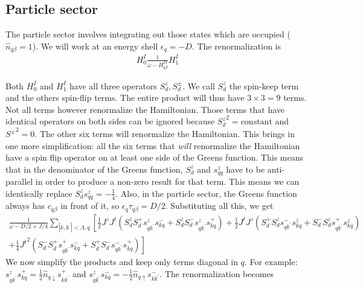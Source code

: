 \documentclass{revtex4-2}
\numberwithin{equation}{section}
\begin{document}
\subsection{Particle sector}
The particle sector involves integrating out those states which are occupied (\(\hat n_{q\beta}=1\)). We will work at an energy  shell \(\epsilon_q = -D\). The renormalization is
\begin{equation}\begin{aligned}
	H^I_0 \frac{1}{\omega - H^D_{q\beta}} H^I_1
\end{aligned}\end{equation}

Both \(H^I_0\) and \(H^I_1\) have all three operators \(S_d^z, S_d^\pm\). We call \(S_d^z\) the spin-keep term and the others spin-flip terms. The entire product will thus have \(3\times 3 = 9\) terms. Not all terms however renormalize the Hamiltonian. Those terms that have identical operators on both sides can be ignored because \({S_d^z}^2 = \text{constant}\) and \({S^\pm}^2 = 0\). The other six terms will renormalize the Hamiltonian. This brings in one more simplification: all the six terms that \textit{will} renormalize the Hamiltonian have a spin flip operator on at least one side of the Greens function. This means that in the denominator of the Greens function, \(S_d^z\) and \(s^z_{qq}\) have to be anti-parallel in order to produce a non-zero result for that term. This means we can identically replace \(S_d^z s^z_{qq} = -\frac{1}{4}\). Also, in the particle sector, the Greens function always has \(c_{q\beta}\) in front of it, so \(\epsilon_q \tau_{q\beta} = D/2\). Substituting all this, we get
\begin{equation}\begin{aligned}
	\frac{1}{\omega - D/2 + J/4}\sum_{|k,k^\prime|<\Lambda,q}\left[\frac{1}{2}J^z J^t \left(S_d^z S_d^+ s^z_{qk^\prime}s^-_{kq} + S_d^z S_d^- s^z_{qk^\prime}s^+_{kq}\right) + \frac{1}{2}J^t J^z \left(S_d^+ S_d^z s^-_{qk^\prime}s^z_{kq} + S_d^- S_d^z s^+_{qk^\prime}s^z_{kq}\right)\right.\\
+\left.\frac{1}{4}{J^t}^2 \left(S_d^- S_d^+ s^+_{qk^\prime}s^-_{kq} + S_d^+ S_d^- s^-_{qk^\prime}s^+_{kq}\right)\right]
\end{aligned}\end{equation}
We now simplify the products and keep only terms diagonal in \(q\). For example: \(s^z_{qk^\prime}s^+_{kq} = \frac{1}{2}\hat n_{q \downarrow}s^+_{kk^\prime}\) and \(s^z_{qk^\prime}s^-_{kq} = -\frac{1}{2}\hat n_{q \uparrow}s^-_{kk^\prime}\). The renormalization becomes
\end{document}
